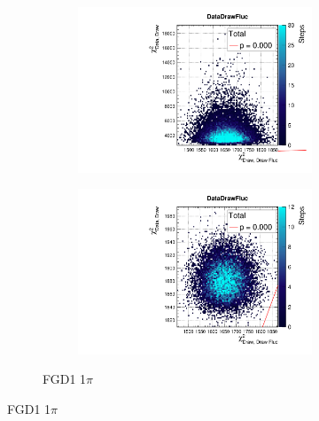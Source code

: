 \begin{figure}[h]
\begin{subfigure}[t]{\textwidth}
\begin{subfigure}[t]{0.24\textwidth}
\includegraphics[width=\textwidth, trim={0mm 0mm 0mm 8mm}, clip,page=20]{figures/mach3/data/priorpred/2017b_NewDet_3Xsec_4Det_5Flux_NewXSecTune_Data_merge_PriorPred_procs}
\end{subfigure}
	\begin{subfigure}[t]{0.24\textwidth}
		\includegraphics[width=\textwidth, trim={0mm 0mm 0mm 8mm}, clip,page=20]{figures/mach3/data/postpred/2017b_NewData_NewDet_UpdXsecStep_2Xsec_4Det_5Flux_0_PostPred_procs}
	\end{subfigure}
\caption{FGD1 1$\pi$}
\end{subfigure}


\end{figure}

